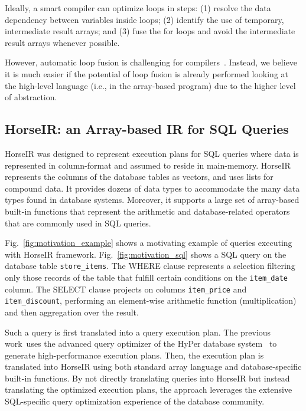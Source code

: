
Ideally, a smart compiler can optimize loops in steps:
(1) resolve the data dependency between variables inside loops;
(2) identify the use of temporary, intermediate result arrays; and
(3) fuse the for loops and avoid the intermediate result arrays whenever possible.

However, automatic loop fusion is challenging for
compilers~\cite{Kennedy01:FastFusion,Kennedy1993:LoopFusion}.
Instead, we believe it is much easier if the potential of loop fusion is
already performed looking at the high-level language
(i.e., in the array-based program) due to the higher level of abstraction.

\subsection{HorseIR: an Array-based IR for SQL Queries}

HorseIR \OldPaper was designed to represent execution plans for SQL queries
where data is represented in column-format and assumed to reside in
main-memory. HorseIR represents the columns of the database tables as vectors,
and uses lists for compound data. It provides dozens of data types to
accommodate the many data types found in database systems. Moreover, it supports a
large set of array-based built-in functions that  represent the arithmetic and
database-related operators that are commonly used in SQL queries.

Fig.~\ref{fig:motivation_example} shows a motivating example of queries
executing with HorseIR framework. Fig.~\ref{fig:motivation_sql} shows a SQL
query on the database table \texttt{store\_items}. The WHERE clause represents
a selection filtering only those records of the table that fulfill certain
conditions on the \texttt{item_date} column. The SELECT clause projects on
columns \texttt{item_price} and \texttt{item\_discount}, performing an
element-wise arithmetic function (multiplication) and then aggregation over the
result. 



Such a query is first translated into a query execution plan. The previous
work~\OldPaper uses the advanced query optimizer of the HyPer database
system~\cite{Neumann2011:HyPer} to generate high-performance execution plans.
Then, the execution plan is translated into HorseIR using both standard array
language and database-specific built-in functions. By not directly translating
queries into HorseIR but instead translating the optimized execution plans, the
approach leverages the extensive SQL-specific query optimization experience of
the database community.

